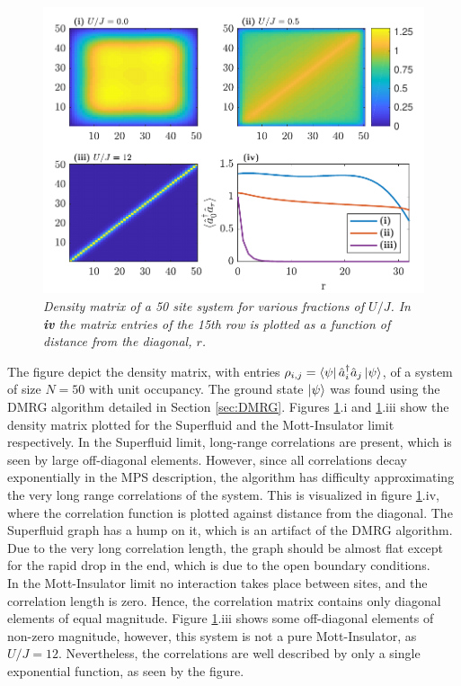 \begin{figure}[h!]
    \centering
    \includegraphics[width=\textwidth]{Figures/DensityMatrices.pdf}
    \caption{\textit{Density matrix of a 50 site system for various fractions of $U/J$. In \textbf{iv} the matrix entries of the 15th row is plotted as a function of distance from the diagonal, $r$. }}
    \label{fig:DensityMatrices}
\end{figure}
The figure depict the density matrix, with entries $\rho_{i,j} = \bra{\psi} \hat{a}_{i}^{\dag} \hat{a}_{j} \ket{\psi}$, of a system of size $N = 50$ with unit occupancy. The ground state $\ket{\psi}$ was found using the DMRG algorithm detailed in Section \ref{sec:DMRG}.
Figures \ref{fig:DensityMatrices}.i and \ref{fig:DensityMatrices}.iii show the density matrix plotted for the Superfluid and the Mott-Insulator limit respectively. In the Superfluid limit, long-range correlations are present, which is seen by large off-diagonal elements. However, since all correlations decay exponentially in the MPS description, the algorithm has difficulty approximating the very long range correlations of the system. This is visualized in figure \ref{fig:DensityMatrices}.iv, where the correlation function is plotted against distance from the diagonal. The Superfluid graph has a hump on it, which is an artifact of the DMRG algorithm. Due to the very long correlation length, the graph should be almost flat except for the rapid drop in the end, which is due to the open boundary conditions.\\
In the Mott-Insulator limit no interaction takes place between sites, and the correlation length is zero. Hence, the correlation matrix contains only diagonal elements of equal magnitude. Figure \ref{fig:DensityMatrices}.iii shows some off-diagonal elements of non-zero magnitude, however, this system is not a pure Mott-Insulator, as $U/J = 12$. Nevertheless, the correlations are well described by only a single exponential function, as seen by the figure.\\
